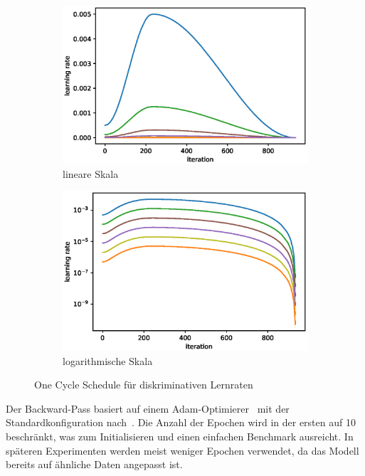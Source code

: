 \begin{figure}
    \centering
    \begin{subfigure}{.5\textwidth}
        \centering
        \includegraphics[width=.9\linewidth]{img/06_one_cycle_lin.eps}
        \caption{lineare Skala}
    \end{subfigure}%
    \begin{subfigure}{.5\textwidth}
        \centering
        \includegraphics[width=.9\linewidth]{img/06_one_cycle_log.eps}
        \caption{logarithmische Skala}
    \end{subfigure}
    \caption{One Cycle Schedule für diskriminativen Lernraten}
    \label{fig:one-cylce}
\end{figure}

Der Backward-Pass basiert auf einem Adam-Optimierer~\cite{Kingma14} mit der Standardkonfiguration nach~\cite{Gugger20}.
Die Anzahl der Epochen wird in der ersten auf 10 beschränkt, was zum Initialisieren und einen einfachen Benchmark ausreicht.
In späteren Experimenten werden meist weniger Epochen verwendet, da das Modell bereits auf ähnliche Daten angepasst ist.

